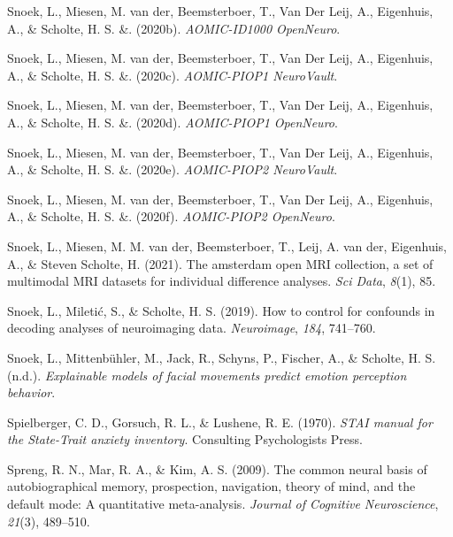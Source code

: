 \documentclass[12pt,american,a4paper,oneside,]{memoir} %
\begin{document}
\leavevmode\hypertarget{ref-Snoek2020-id1000}{}%
Snoek, L., Miesen, M. van der, Beemsterboer, T., Van Der Leij, A., Eigenhuis, A., \& Scholte, H. S. \&. (2020b). \emph{AOMIC-ID1000 OpenNeuro}.

\leavevmode\hypertarget{ref-Snoek2020n-piop1}{}%
Snoek, L., Miesen, M. van der, Beemsterboer, T., Van Der Leij, A., Eigenhuis, A., \& Scholte, H. S. \&. (2020c). \emph{AOMIC-PIOP1 NeuroVault}.

\leavevmode\hypertarget{ref-Snoek2020-piop1}{}%
Snoek, L., Miesen, M. van der, Beemsterboer, T., Van Der Leij, A., Eigenhuis, A., \& Scholte, H. S. \&. (2020d). \emph{AOMIC-PIOP1 OpenNeuro}.

\leavevmode\hypertarget{ref-Snoek2020n-piop2}{}%
Snoek, L., Miesen, M. van der, Beemsterboer, T., Van Der Leij, A., Eigenhuis, A., \& Scholte, H. S. \&. (2020e). \emph{AOMIC-PIOP2 NeuroVault}.

\leavevmode\hypertarget{ref-Snoek2020-piop2}{}%
Snoek, L., Miesen, M. van der, Beemsterboer, T., Van Der Leij, A., Eigenhuis, A., \& Scholte, H. S. \&. (2020f). \emph{AOMIC-PIOP2 OpenNeuro}.

\leavevmode\hypertarget{ref-Snoek2021-jx}{}%
Snoek, L., Miesen, M. M. van der, Beemsterboer, T., Leij, A. van der, Eigenhuis, A., \& Steven Scholte, H. (2021). The amsterdam open MRI collection, a set of multimodal MRI datasets for individual difference analyses. \emph{Sci Data}, \emph{8}(1), 85.

\leavevmode\hypertarget{ref-Snoek2019-my}{}%
Snoek, L., Miletić, S., \& Scholte, H. S. (2019). How to control for confounds in decoding analyses of neuroimaging data. \emph{Neuroimage}, \emph{184}, 741--760.

\leavevmode\hypertarget{ref-snoek-submitted}{}%
Snoek, L., Mittenbühler, M., Jack, R., Schyns, P., Fischer, A., \& Scholte, H. S. (n.d.). \emph{Explainable models of facial movements predict emotion perception behavior}.

\leavevmode\hypertarget{ref-Spielberger1970-td}{}%
Spielberger, C. D., Gorsuch, R. L., \& Lushene, R. E. (1970). \emph{STAI manual for the State-Trait anxiety inventory}. Consulting Psychologists Press.

\leavevmode\hypertarget{ref-spreng2009common}{}%
Spreng, R. N., Mar, R. A., \& Kim, A. S. (2009). The common neural basis of autobiographical memory, prospection, navigation, theory of mind, and the default mode: A quantitative meta-analysis. \emph{Journal of Cognitive Neuroscience}, \emph{21}(3), 489--510.
\end{document}
